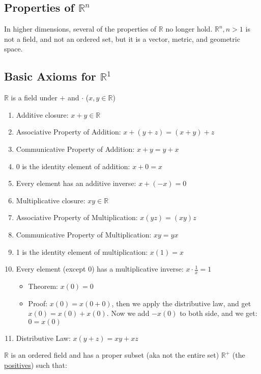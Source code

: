 \documentclass[11 pt, twoside]{article}
\begin{document}
\subsection{Properties of $\mathbb{R}^n$}
In higher dimensions, several of the properties of $\mathbb{R}$ no longer hold.
$\mathbb{R}^n, n > 1$ is not a field, and not an ordered set, but it is a vector, metric, and geometric space.

\subsection{Basic Axioms for $\mathbb{R}^1$}
$\mathbb{R}$ is a field under $+$ and $\cdot$ ($x, y \in \mathbb{R}$)
\begin{enumerate}
    \item Additive closure: $x + y \in \mathbb{R}$
    \item Associative Property of Addition: $x + (y + z) = (x + y) + z$
    \item Communicative Property of Addition: $x + y = y + x$
    \item 0 is the identity element of addition: $x + 0 = x$
    \item Every element has an additive inverse: $x + (-x) = 0$
    \item Multiplicative closure: $xy \in \mathbb{R}$
    \item Associative Property of Multiplication: $x(yz) = (xy)z$
    \item Communicative Property of Multiplication: $xy = yx$
    \item 1 is the identity element of multiplication: $x(1) = x$
    \item Every element (except 0) has a multiplicative inverse: $x \cdot \frac{1}{x} = 1$
        \begin{itemize}
            \item Theorem: $x(0) = 0$
            \item Proof: $x(0) = x(0 + 0)$, then we apply the distributive law,
                and get $x(0) = x(0) + x(0)$. Now we add $-x(0)$ to both side,
                and we get: $0 = x(0)$
        \end{itemize}
    \item Distributive Law: $x(y + z) = xy + xz$
\end{enumerate}
\vspace{11pt}
$\mathbb{R}$ is an ordered field and has a proper subset (aka not the entire
set) $\mathbb{R}^+$ (the \underline{positives}) such that:
\end{document}
